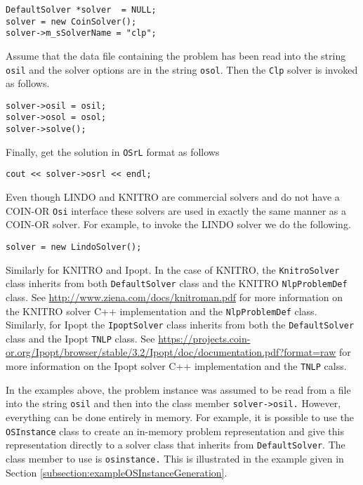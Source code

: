 \documentclass[11pt]{article}
\renewcommand{\_}{{\char"5F}}
\renewcommand{\{}{{\char"7B}}
\renewcommand{\}}{{\char"7D}}
\renewcommand{\^}{{\char"0D}}
\renewcommand{\'}{{\char"0D}}
\begin{document}
\begin{verbatim}
DefaultSolver *solver  = NULL;
solver = new CoinSolver();
solver->m_sSolverName = "clp";
\end{verbatim}

Assume that the data file containing the problem has been read into the string {\tt osil} and the solver options are in the string {\tt osol}. Then the {\tt Clp} solver is invoked as follows.

\begin{verbatim}
solver->osil = osil;
solver->osol = osol;
solver->solve();
\end{verbatim}

Finally, get the solution in {\tt OSrL} format as follows

\begin{verbatim}
cout << solver->osrl << endl;
\end{verbatim}

Even though LINDO and KNITRO are commercial solvers and do not have a COIN-OR {\tt Osi} interface these solvers are used in exactly the same manner as a COIN-OR solver. For example, to invoke the LINDO solver we do the following.

\begin{verbatim}
solver = new LindoSolver();	
\end{verbatim}

Similarly for KNITRO and Ipopt. In the case of  KNITRO, the {\tt KnitroSolver} class inherits from both {\tt DefaultSolver} class and the KNITRO {\tt NlpProblemDef} class. See \url{http://www.ziena.com/docs/knitroman.pdf} for more information on the KNITRO solver C++ implementation and the {\tt NlpProblemDef} class. Similarly, for Ipopt the {\tt IpoptSolver} class inherits from both the  {\tt DefaultSolver} class and the Ipopt {\tt TNLP} class.  See \url{https://projects.coin-or.org/Ipopt/browser/stable/3.2/Ipopt/doc/documentation.pdf?format=raw} for more information on the Ipopt solver C++ implementation and the {\tt TNLP} calss.

In the examples above,  the problem instance was assumed to be read from a file into the string {\tt osil} and then into the class member {\tt solver->osil.} However, everything can be done entirely in memory. For example, it is possible to use the {\tt OSInstance} class to create an in-memory problem representation and give this representation directly to a solver class that inherits from {\tt DefaultSolver}. The class member to use is {\tt osinstance.} This is illustrated in the example given in Section \ref{subsection:exampleOSInstanceGeneration}.
\end{document}
